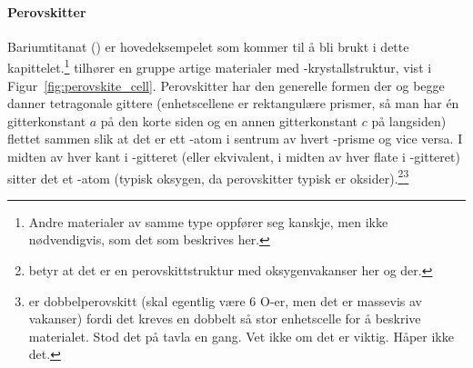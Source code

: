 \paragraph{Perovskitter} Bariumtitanat () er hovedeksempelet som kommer til å bli brukt i dette kapittelet.\footnote{Andre materialer av samme type oppfører seg kanskje, men ikke nødvendigvis, som det som beskrives her.}  tilhører en gruppe artige materialer med -krystallstruktur, vist i Figur~\ref{fig:perovskite_cell}. Perovskitter har den generelle formen  der  og  begge danner tetragonale gittere (enhetscellene er rektangulære prismer, så man har én gitterkonstant $a$ på den korte siden og en annen gitterkonstant $c$ på langsiden) flettet sammen slik at det er ett -atom i sentrum av hvert -prisme og vice versa. I midten av hver kant i -gitteret (eller ekvivalent, i midten av hver flate i -gitteret) sitter det et -atom (typisk oksygen, da perovskitter typisk er oksider).\footnote{ betyr at det er en perovskittstruktur med oksygenvakanser her og der.}\footnote{ er dobbelperovskitt (skal egentlig være 6 O-er, men det er massevis av vakanser) fordi det kreves en dobbelt så stor enhetscelle for å beskrive materialet. Stod det på tavla en gang. Vet ikke om det er viktig. Håper ikke det.}

